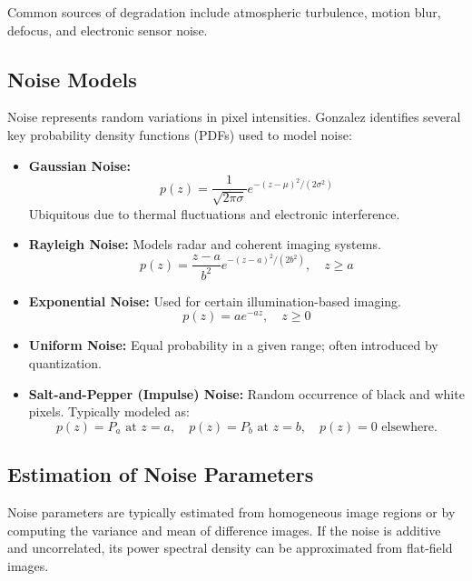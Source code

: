 \documentclass[12pt,a4paper]{AnantDocumentation}
\begin{document}
Common sources of degradation include atmospheric turbulence, motion blur, defocus, and electronic sensor noise.

\subsection{Noise Models}
Noise represents random variations in pixel intensities. Gonzalez identifies several key probability density functions (PDFs) used to model noise:

\begin{itemize}
\item \textbf{Gaussian Noise:}
\begin{equation}
p(z) = \frac{1}{\sqrt{2\pi\sigma}} e^{-(z - \mu)^2 / (2\sigma^2)}
\end{equation}
Ubiquitous due to thermal fluctuations and electronic interference.

\item \textbf{Rayleigh Noise:}
Models radar and coherent imaging systems.
\begin{equation}
p(z) = \frac{z - a}{b^2} e^{-(z - a)^2 / (2b^2)}, \quad z \ge a
\end{equation}

\item \textbf{Exponential Noise:}
Used for certain illumination-based imaging.
\begin{equation}
p(z) = a e^{-az}, \quad z \ge 0
\end{equation}

\item \textbf{Uniform Noise:}
Equal probability in a given range; often introduced by quantization.

\item \textbf{Salt-and-Pepper (Impulse) Noise:}
Random occurrence of black and white pixels. Typically modeled as:
\begin{equation}
p(z) = P_a \text{ at } z=a, \quad p(z) = P_b \text{ at } z=b, \quad p(z)=0 \text{ elsewhere.}
\end{equation}
\end{itemize}

\subsection{Estimation of Noise Parameters}
Noise parameters are typically estimated from homogeneous image regions or by computing the variance and mean of difference images. If the noise is additive and uncorrelated, its power spectral density can be approximated from flat-field images.
\end{document}
